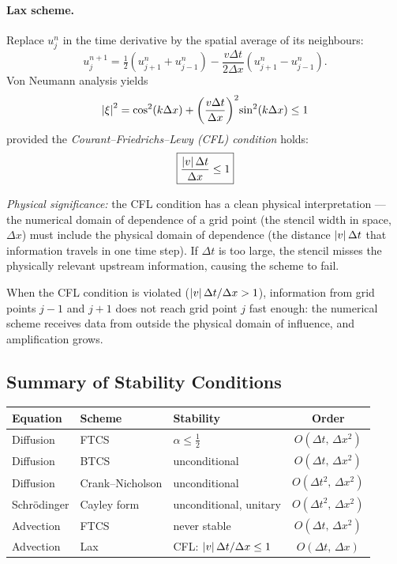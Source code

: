 \paragraph{Lax scheme.}
Replace $u_j^n$ in the time derivative by the spatial average of its
neighbours:
\begin{equation}
  u_j^{n+1}
  = \tfrac{1}{2}\!\left(u_{j+1}^n + u_{j-1}^n\right)
  - \frac{v\Delta t}{2\Delta x}\!\left(u_{j+1}^n-u_{j-1}^n\right).
  \label{eq:lec09:lax}
\end{equation}
Von Neumann analysis yields
\begin{equation}
  \left|\xi\right|^2
  = \cos^2(k\Delta x)
    + \left(\frac{v\Delta t}{\Delta x}\right)^2\!\sin^2(k\Delta x) \leq 1
  \label{eq:lec09:lax-stability}
\end{equation}
provided the \emph{Courant–Friedrichs–Lewy (CFL) condition} holds:
\begin{equation}
  \boxed{
  \frac{\left|v\right|\Delta t}{\Delta x} \leq 1}
  \label{eq:lec09:cfl}
\end{equation}

\textit{Physical significance:} the CFL condition has a clean physical
interpretation — the numerical domain of dependence of a grid point
(the stencil width in space, $\Delta x$) must include the physical
domain of dependence (the distance $\left|v\right|\Delta t$ that information
travels in one time step).  If $\Delta t$ is too large, the stencil
misses the physically relevant upstream information, causing the scheme
to fail.

When the CFL condition is violated ($\left|v\right|\Delta t/\Delta x > 1$),
information from grid points $j-1$ and $j+1$ does not reach grid point
$j$ fast enough: the numerical scheme receives data from outside the
physical domain of influence, and amplification grows.

\subsection*{Summary of Stability Conditions}
\label{subsec:lec09:summary}

\begin{center}
\renewcommand{\arraystretch}{1.4}
\begin{tabular}{lllc}
  \toprule
  Equation & Scheme & Stability & Order \\
  \midrule
  Diffusion & FTCS & $\alpha\leq\tfrac{1}{2}$ & $O(\Delta t,\,\Delta x^2)$ \\
  Diffusion & BTCS & unconditional & $O(\Delta t,\,\Delta x^2)$ \\
  Diffusion & Crank--Nicholson & unconditional & $O(\Delta t^2,\,\Delta x^2)$ \\
  Schrödinger & Cayley form & unconditional, unitary & $O(\Delta t^2,\,\Delta x^2)$ \\
  Advection & FTCS & never stable & $O(\Delta t,\,\Delta x^2)$ \\
  Advection & Lax & CFL: $\left|v\right|\Delta t/\Delta x\leq 1$ & $O(\Delta t,\,\Delta x)$ \\
  \bottomrule
\end{tabular}
\end{center}

